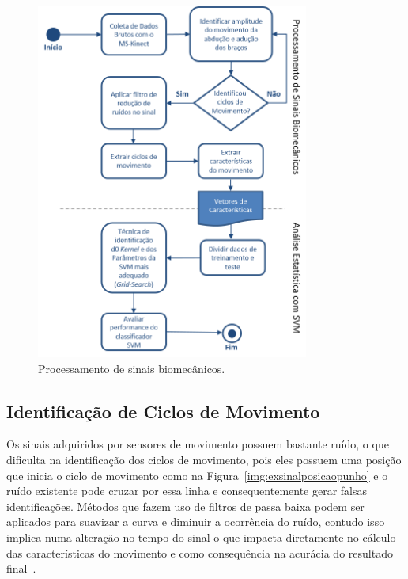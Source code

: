 \begin{figure}[!htb]
     \centering
     \includegraphics[width=0.8\textwidth]{./img/biomecprocessor2.png}
     \caption{Processamento de sinais biomecânicos.}
     \label{img:process_bio}
\end{figure}


\subsection{Identificação de Ciclos de Movimento}\label{section:identificao_ciclos}

Os sinais adquiridos por sensores de movimento possuem bastante ruído, o que dificulta na identificação dos ciclos de movimento, pois eles possuem uma posição que inicia o ciclo de movimento como na Figura~\ref{img:exsinalposicaopunho} e o ruído existente pode cruzar por essa linha e consequentemente gerar falsas identificações. Métodos que fazem uso de filtros de passa baixa podem ser aplicados para suavizar a curva e diminuir a ocorrência do ruído, contudo isso implica numa alteração no tempo do sinal o que impacta diretamente no cálculo das características do movimento e como consequência na acurácia do resultado final~\cite{peakdetect}.

